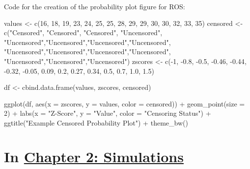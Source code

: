\documentclass[12pt, twoside]{amherstthesis}
\newenvironment{Shaded}{\begin{snugshade}}{\end{snugshade}}
\newcommand{\AttributeTok}[1]{\textcolor[rgb]{0.77,0.63,0.00}{#1}}
\newcommand{\DecValTok}[1]{\textcolor[rgb]{0.00,0.00,0.81}{#1}}
\newcommand{\FloatTok}[1]{\textcolor[rgb]{0.00,0.00,0.81}{#1}}
\newcommand{\FunctionTok}[1]{\textcolor[rgb]{0.00,0.00,0.00}{#1}}
\newcommand{\NormalTok}[1]{#1}
\newcommand{\OtherTok}[1]{\textcolor[rgb]{0.56,0.35,0.01}{#1}}
\newcommand{\SpecialCharTok}[1]{\textcolor[rgb]{0.00,0.00,0.00}{#1}}
\newcommand{\StringTok}[1]{\textcolor[rgb]{0.31,0.60,0.02}{#1}}
\begin{document}
Code for the creation of the probability plot figure for ROS:
\begin{Shaded}
\begin{Highlighting}[]
\NormalTok{values }\OtherTok{\textless{}{-}} \FunctionTok{c}\NormalTok{(}\DecValTok{16}\NormalTok{, }\DecValTok{18}\NormalTok{, }\DecValTok{19}\NormalTok{, }\DecValTok{23}\NormalTok{, }\DecValTok{24}\NormalTok{, }\DecValTok{25}\NormalTok{, }\DecValTok{25}\NormalTok{, }\DecValTok{28}\NormalTok{, }\DecValTok{29}\NormalTok{, }\DecValTok{29}\NormalTok{, }\DecValTok{30}\NormalTok{, }\DecValTok{30}\NormalTok{, }\DecValTok{32}\NormalTok{, }\DecValTok{33}\NormalTok{, }\DecValTok{35}\NormalTok{)}
\NormalTok{censored }\OtherTok{\textless{}{-}}\FunctionTok{c}\NormalTok{(}\StringTok{"Censored"}\NormalTok{, }\StringTok{"Censored"}\NormalTok{, }\StringTok{"Censored"}\NormalTok{, }\StringTok{"Uncensored"}\NormalTok{,}
             \StringTok{"Uncensored"}\NormalTok{,}\StringTok{"Uncensored"}\NormalTok{,}\StringTok{"Uncensored"}\NormalTok{,}\StringTok{"Uncensored"}\NormalTok{,}
             \StringTok{"Uncensored"}\NormalTok{,}\StringTok{"Uncensored"}\NormalTok{,}\StringTok{"Uncensored"}\NormalTok{,}\StringTok{"Uncensored"}\NormalTok{,}
             \StringTok{"Uncensored"}\NormalTok{,}\StringTok{"Uncensored"}\NormalTok{,}\StringTok{"Uncensored"}\NormalTok{)}
\NormalTok{zscores }\OtherTok{\textless{}{-}} \FunctionTok{c}\NormalTok{(}\SpecialCharTok{{-}}\DecValTok{1}\NormalTok{, }\SpecialCharTok{{-}}\FloatTok{0.8}\NormalTok{, }\SpecialCharTok{{-}}\FloatTok{0.5}\NormalTok{, }\SpecialCharTok{{-}}\FloatTok{0.46}\NormalTok{, }\SpecialCharTok{{-}}\FloatTok{0.44}\NormalTok{, }\SpecialCharTok{{-}}\FloatTok{0.32}\NormalTok{, }\SpecialCharTok{{-}}\FloatTok{0.05}\NormalTok{, }
             \FloatTok{0.09}\NormalTok{, }\FloatTok{0.2}\NormalTok{, }\FloatTok{0.27}\NormalTok{, }\FloatTok{0.34}\NormalTok{, }\FloatTok{0.5}\NormalTok{, }\FloatTok{0.7}\NormalTok{, }\FloatTok{1.0}\NormalTok{, }\FloatTok{1.5}\NormalTok{)}

\NormalTok{df }\OtherTok{\textless{}{-}} \FunctionTok{cbind.data.frame}\NormalTok{(values, zscores, censored)}

\FunctionTok{ggplot}\NormalTok{(df, }\FunctionTok{aes}\NormalTok{(}\AttributeTok{x =}\NormalTok{ zscores, }\AttributeTok{y =}\NormalTok{ values, }\AttributeTok{color =}\NormalTok{ censored)) }\SpecialCharTok{+} 
  \FunctionTok{geom\_point}\NormalTok{(}\AttributeTok{size =} \DecValTok{2}\NormalTok{) }\SpecialCharTok{+}
  \FunctionTok{labs}\NormalTok{(}\AttributeTok{x =} \StringTok{"Z{-}Score"}\NormalTok{, }\AttributeTok{y =} \StringTok{"Value"}\NormalTok{, }\AttributeTok{color =} \StringTok{"Censoring Status"}\NormalTok{) }\SpecialCharTok{+}
  \FunctionTok{ggtitle}\NormalTok{(}\StringTok{"Example Censored Probability Plot"}\NormalTok{) }\SpecialCharTok{+}
  \FunctionTok{theme\_bw}\NormalTok{()}
\end{Highlighting}
\end{Shaded}
\hypertarget{in-chapter-2-simulations}{%
\section{\texorpdfstring{In \protect\hyperlink{simulations}{Chapter 2: Simulations}}{In Chapter 2: Simulations}}\label{in-chapter-2-simulations}}
\end{document}
